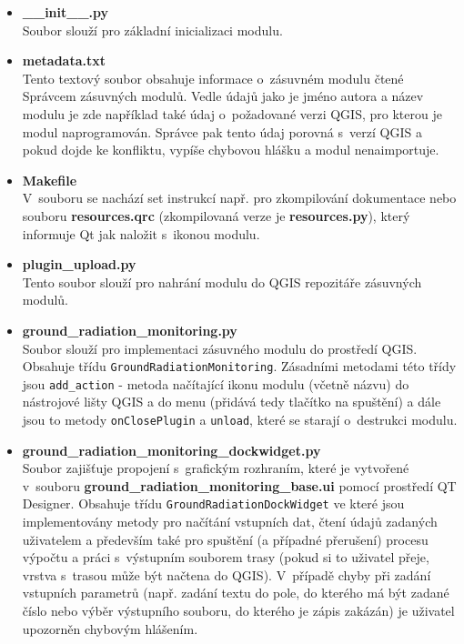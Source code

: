 \begin{itemize} 
	\item \textbf{\_\_init\_\_.py} \\ 
		Soubor slouží pro základní inicializaci modulu.
		 
	\item \textbf{metadata.txt} \\
		Tento textový soubor obsahuje informace o~zásuvném modulu čtené Správcem zásuvných modulů. Vedle údajů jako je jméno autora a název modulu je zde například také údaj o~požadované verzi QGIS, pro kterou je modul naprogramován. Správce pak tento údaj porovná s~verzí QGIS a pokud dojde ke konfliktu, vypíše chybovou hlášku a modul nenaimportuje.
	
	\item \textbf{Makefile} \\
		V~souboru se nachází set instrukcí např. pro zkompilování dokumentace nebo souboru \textbf{resources.qrc} (zkompilovaná verze je \textbf{resources.py}), který informuje Qt jak naložit s~ikonou modulu.
		
	\item \textbf{plugin\_upload.py} \\
		Tento soubor slouží pro nahrání modulu do QGIS repozitáře zásuvných modulů.

	\item \textbf{ground\_radiation\_monitoring.py} \\
		Soubor slouží pro implementaci zásuvného modulu do prostředí QGIS. Obsahuje třídu \texttt{GroundRadiationMonitoring}. Zásadními metodami této třídy jsou \texttt{add\_action} - metoda načítající ikonu modulu (včetně názvu) do nástrojové lišty QGIS a do menu (přidává tedy tlačítko na spuštění) a dále jsou to metody \texttt{onClosePlugin} a \texttt{unload}, které se starají o~destrukci modulu.

	\item \textbf{ground\_radiation\_monitoring\_dockwidget.py} \\
		Soubor zajišťuje propojení s~grafickým rozhraním, které je vytvořené v~souboru \textbf{ground\_radiation\_monitoring\_base.ui} pomocí prostředí QT Designer. Obsahuje třídu \texttt{GroundRadiationDockWidget} ve které jsou implementovány metody pro načítání vstupních dat, čtení údajů zadaných uživatelem a především také pro spuštění (a případné přerušení) procesu výpočtu a práci s~výstupním souborem trasy (pokud si to uživatel přeje, vrstva s~trasou může být načtena do QGIS). V~případě chyby při zadání vstupních parametrů (např. zadání textu do pole, do kterého má být zadané číslo nebo výběr výstupního souboru, do kterého je zápis zakázán) je uživatel upozorněn chybovým hlášením.     
	

\end{itemize}
